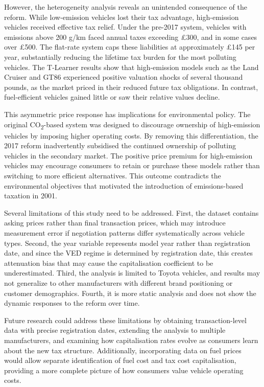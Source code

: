 \documentclass[12pt, a4paper]{article}
\begin{document}
However, the heterogeneity analysis reveals an unintended consequence of the reform. While low-emission vehicles lost their tax advantage, high-emission vehicles received effective tax relief. Under the pre-2017 system, vehicles with emissions above 200 g/km faced annual taxes exceeding £300, and in some cases over £500. The flat-rate system caps these liabilities at approximately £145 per year, substantially reducing the lifetime tax burden for the most polluting vehicles. The T-Learner results show that high-emission models such as the Land Cruiser and GT86 experienced positive valuation shocks of several thousand pounds, as the market priced in their reduced future tax obligations. In contrast, fuel-efficient vehicles gained little or saw their relative values decline.

This asymmetric price response has implications for environmental policy. The original CO\textsubscript{2}-based system was designed to discourage ownership of high-emission vehicles by imposing higher operating costs. By removing this differentiation, the 2017 reform inadvertently subsidised the continued ownership of polluting vehicles in the secondary market. The positive price premium for high-emission vehicles may encourage consumers to retain or purchase these models rather than switching to more efficient alternatives. This outcome contradicts the environmental objectives that motivated the introduction of emissions-based taxation in 2001.

Several limitations of this study need to be addressed. First, the dataset contains asking prices rather than final transaction prices, which may introduce measurement error if negotiation patterns differ systematically across vehicle types. Second, the year variable represents model year rather than registration date, and since the VED regime is determined by registration date, this creates attenuation bias that may cause the capitalisation coefficient to be underestimated. Third, the analysis is limited to Toyota vehicles, and results may not generalize to other manufacturers with different brand positioning or customer demographics. Fourth, it is more static analysis and does not show the dynamic responses to the reform over time.

Future research could address these limitations by obtaining transaction-level data with precise registration dates, extending the analysis to multiple manufacturers, and examining how capitalisation rates evolve as consumers learn about the new tax structure. Additionally, incorporating data on fuel prices would allow separate identification of fuel cost and tax cost capitalisation, providing a more complete picture of how consumers value vehicle operating costs.
\end{document}
